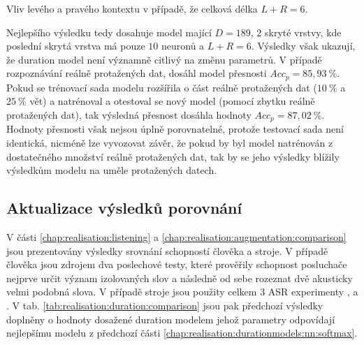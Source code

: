 \begin{table}[htpb]
  \centering
  \def\arraystretch{1.5}
  \caption{Vliv levého a pravého kontextu v případě, že celková délka $L + R = 6$.}
  \label{tab:realisation:duration:context:asymetric}
\end{table}

Nejlepšího výsledku tedy dosahuje model mající $D = 189$, $2$ skryté vrstvy, kde poslední skrytá vrstva má pouze $10$ neuronů a $L + R = 6$. Výsledky však ukazují, že duration model není významně citlivý na změnu parametrů. V případě rozpoznávání reálně protažených dat, dosáhl model přesnosti $Acc_{p} = 85,93\ \%$. Pokud se trénovací sada modelu rozšířila o část reálně protažených dat ($10\ \%$ a $25\ \%$ vět) a natrénoval a otestoval se nový model (pomocí zbytku reálně protažených dat), tak výsledná přesnost dosáhla hodnoty $Acc_{p} = 87,02\ \%$. Hodnoty přesnosti však nejsou úplně porovnatelné, protože testovací sada není identická, nicméně lze vyvozovat závěr, že pokud by byl model natrénován z dostatečného množství reálně protažených dat, tak by se jeho výsledky blížily výsledkům modelu na uměle protažených datech.


\subsection{Aktualizace výsledků porovnání}
\label{chap:realisation:duration:comparison}

V části \ref{chap:realisation:listening} a \ref{chap:realisation:augmentation:comparison} jsou prezentovány výsledky srovnání schopností člověka a stroje. V případě člověka jsou zdrojem dva poslechové testy, které prověřily schopnost posluchače nejprve určit význam izolovaných slov a následně od sebe rozeznat dvě akusticky velmi podobná slova. V případě stroje jsou použity celkem $3$ ASR experimenty ,  a . V tab. \ref{tab:realisation:duration:comparison} jsou pak předchozí výsledky doplněny o hodnoty dosažené duration modelem jehož parametry odpovídají nejlepšímu modelu z předchozí části \ref{chap:realisation:durationmodels:nn:softmax}.

